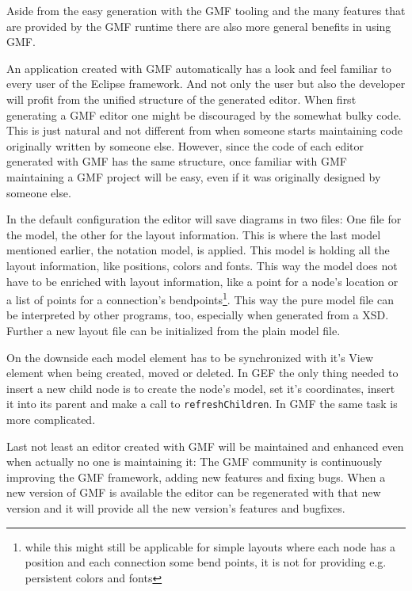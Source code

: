 Aside from the easy generation with the GMF tooling and the many features that are provided by the GMF runtime there are also more general benefits in using GMF.

An application created with GMF automatically has a look and feel familiar to every user of the Eclipse framework. And not only the user but also the developer will profit from the unified structure of the generated editor. When first generating a GMF editor one might be discouraged by the somewhat bulky code. This is just natural and not different from when someone starts maintaining code originally written by someone else. However, since the code of each editor generated with GMF has the same structure, once familiar with GMF maintaining a GMF project will be easy, even if it was originally designed by someone else.

In the default configuration the editor will save diagrams in two files: One file for the model, the other for the layout information. This is where the last model mentioned earlier, the notation model, is applied. This model is holding all the layout information, like positions, colors and fonts. This way the model does not have to be enriched with layout information, like a point for a node's location or a list of points for a connection's bendpoints\footnote{while this might still be applicable for simple layouts where each node has a position and each connection some bend points, it is not for providing e.g. persistent colors and fonts}. This way the pure model file can be interpreted by other programs, too, especially when generated from a XSD. Further a new layout file can be initialized from the plain model file.

On the downside each model element has to be synchronized with it's View element when being created, moved or deleted. In GEF the only thing needed to insert a new child node is to create the node's model, set it's coordinates, insert it into its parent and make a call to \verb|refreshChildren|. In GMF the same task is more complicated.

Last not least an editor created with GMF will be maintained and enhanced even when actually no one is maintaining it: The GMF community is continuously improving the GMF framework, adding new features and fixing bugs. When a new version of GMF is available the editor can be regenerated with that new version and it will provide all the new version's features and bugfixes.

